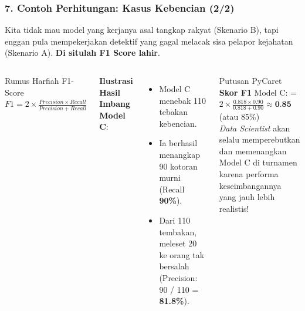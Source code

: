 \documentclass[t,aspectratio=169,xcolor=dvipsnames]{beamer}
\begin{document}
\begin{frame}
    \frametitle{7. Contoh Perhitungan: Kasus Kebencian (2/2)}
    \scriptsize
    Kita tidak mau model yang kerjanya asal tangkap rakyat (Skenario B), tapi enggan pula mempekerjakan detektif yang gagal melacak sisa pelapor kejahatan (Skenario A). \textbf{Di situlah F1 Score lahir}.
    \vspace{0.2cm}
    \begin{columns}[T]
        \begin{block}{Rumus Harfiah F1-Score}
            $F1 = 2 \times \frac{Precision \times Recall}{Precision + Recall}$
        \end{block}
        \textbf{Ilustrasi Hasil Imbang Model C}:
        \begin{itemize}
            \item Model C menebak 110 tebakan kebencian.
            \item Ia berhasil menangkap 90 kotoran murni (Recall \textbf{90\%}).
            \item Dari 110 tembakan, meleset 20 ke orang tak bersalah (Precision: 90 / 110 = \textbf{81.8\%}).
        \end{itemize}

        \begin{block}{Putusan PyCaret}
            \textbf{Skor F1} Model C:
            = $2 \times \frac{0.818 \times 0.90}{0.818 + 0.90} \approx \textbf{0.85}$ (atau 85\%)\\
            \vspace{0.2cm}
            \textit{Data Scientist} akan selalu memperebutkan dan memenangkan Model C di turnamen karena performa keseimbangannya yang jauh lebih realistis!
        \end{block}
    \end{columns}
\end{frame}
\end{document}

